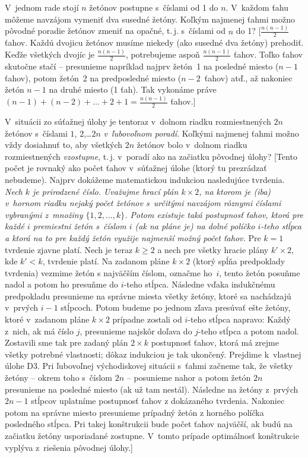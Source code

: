 {V~jednom rade stojí $n$ žetónov postupne s~číslami od 1 do $n$.
V~každom ťahu môžeme navzájom vymeniť dva susedné žetóny. Koľkým
najmenej ťahmi možno pôvodné poradie žetónov zmeniť na opačné, t.\,j.
s~číslami od $n$ do 1?
[$\frac{n(n-1)}{2}$ ťahov. Každú dvojicu žetónov musíme niekedy
(ako susedné dva žetóny) prehodiť.
Keďže všetkých dvojíc je $\frac{n(n-1)}{2}$, potrebujeme aspoň
$\frac{n(n-1)}{2}$ ťahov. Toľko ťahov skutočne stačí --
presunieme napríklad najprv žetón~1 na posledné miesto ($n-1$ ťahov), potom
žetón~2 na predposledné miesto ($n-2$~ťahov) atď., až nakoniec
žetón $n-1$ na druhé miesto (1 ťah). Tak vykonáme práve
$(n-1)+(n-2)+\dots+2+1 = \frac{n(n-1)}{2}$ ťahov.]

V~situácii zo súťažnej úlohy je tentoraz v~dolnom riadku
rozmiestnených $2n$ žetónov s~číslami $1$, $2$,\dots $2n$
{\it v~ľubovoľnom poradí}. Koľkými najmenej ťahmi možno vždy dosiahnuť to,
aby všetkých $2n$ žetónov bolo v~dolnom riadku rozmiestnených {\it vzostupne},
t.\,j. v~poradí ako na začiatku pôvodnej úlohy?
[Tento počet je rovnaký ako počet ťahov v~súťažnej úlohe (ktorý tu
prezrádzať nebudeme). Najprv dokážeme matematickou indukciou
nasledujúce tvrdenia. {\sl Nech $k$ je prirodzené číslo.
Uvažujme hrací plán $k\times2$, na ktorom je (iba) v~hornom riadku
nejaký počet žetónov s~určitými navzájom rôznymi číslami vybranými
z~množiny $\{1,2,\dots,k\}$. Potom existuje taká postupnosť ťahov,
ktorá pre každé $i$ premiestni žetón s~číslom $i$ (ak na pláne je)
na dolné políčko $i$-teho stĺpca a ktorá na to pre každý žetón
využije najmenší možný počet ťahov.} Pre $k=1$ tvrdenie zjavne platí.
Nech je teraz $k \geq 2$ a
nech pre všetky hracie plány $k'\times2$, kde $k'<k$, tvrdenie platí.
Na zadanom pláne $k\times 2$ (ktorý spĺňa predpoklady tvrdenia)
vezmime žetón s najväčším číslom, označme ho~$i$,
tento žetón posuňme nadol a potom ho
presuňme do $i$-teho stĺpca. Následne vďaka indukčnému predpokladu
presunieme na správne miesta všetky žetóny,
ktoré sa nachádzajú v~prvých $i-1$ stĺpcoch. Potom budeme po jednom
zľava presúvať ešte žetóny, ktoré v~zadanom pláne $k\times 2$
prípadne zostali od $i$-teho stĺpca napravo: Každý z~nich,
ak má číslo $j$, presunieme najskôr doľava do $j$-teho stĺpca a potom
nadol. Zostavili sme tak pre zadaný plán $2\times k$ postupnosť
ťahov, ktorá má zrejme všetky potrebné vlastnosti; dôkaz indukciou
je tak ukončený.\hfil\break
%
\indent Prejdime k~vlastnej úlohe D3. Pri ľubovoľnej východiskovej situácii s~ťahmi
začneme tak, že všetky žetóny -- okrem toho s~číslom $2n$ --
posunieme nahor a potom žetón $2n$ presunieme na posledné miesto
(ak už tam nestál). Následne na žetóny z~prvých $2n-1$ stĺpcov
uplatníme postupnosť ťahov z dokázaného tvrdenia. Nakoniec potom
na správne miesto presunieme prípadný žetón z horného políčka
posledného stĺpca. Pri takej konštrukcii bude počet ťahov
najväčší, ak budú na začiatku žetóny
usporiadané zostupne. V~tomto prípade optimálnosť konštrukcie
vyplýva z~riešenia pôvodnej úlohy.]
}

